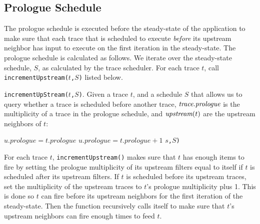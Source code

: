 \subsection{Prologue Schedule}
\label{sec:prologue}
The prologue schedule is executed before the steady-state of the
application to make sure that each trace that is scheduled to execute
{\it before} its upstream neighbor has input to execute on the first
iteration in the steady-state.  The prologue schedule is calculated as
follows.  We iterate over the steady-state schedule, $S$, as
calculated by the trace scheduler.  For each trace $t$, call {\tt
incrementUpstream(}$t${\tt,}$S${\tt )} listed below.

\begin{algorithm}
\caption{IncrementUpstream} \label{alg:incrementUpstream}
{\tt incrementUpStream(}$t${\tt ,}$S${\tt )}. Given a trace $t$, and a
schedule $S$ that allows us to query whether a trace is scheduled
before another trace, $\mbox{\it trace}.\mbox{\it prologue}$ is
the multiplicity of a trace in the prologue schedule, and
$\mbox{\it upstream}(t)$ are the upstream neighbors of $t$:
\begin{algorithmic}
\STATE $u.prologue = t.prologue$
\ELSE
\STATE $u.prologue = t.prologue + 1$ 
\ENDIF 
{}$s${\tt ,}$S${\tt )}
\ENDFOR
\end{algorithmic}
\end{algorithm}

For each trace $t$, {\tt incrementUpstream()} makes sure that $t$ has
enough items to fire by setting the prologue multiplicity of its
upstream filters equal to itself if $t$ is scheduled after its
upstream filters.  If $t$ is scheduled before its upstream traces, set
the multiplicity of the upstream traces to $t$'s prologue multiplicity
plus 1.  This is done so $t$ can fire before its upstream neighbors
for the first iteration of the steady-state.  Then the function
recursively calls itself to make sure that $t$'s upstream neighbors
can fire enough times to feed $t$.
